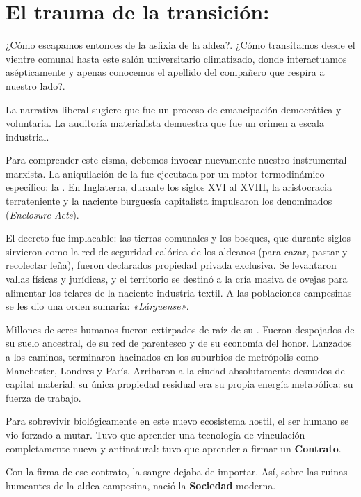 \section{El trauma de la transición: \Cercamientos}

¿Cómo escapamos entonces de la asfixia de la aldea?. ¿Cómo transitamos desde el vientre comunal hasta este salón universitario climatizado, donde interactuamos asépticamente y apenas conocemos el apellido del compañero que respira a nuestro lado?. 

La narrativa liberal sugiere que fue un proceso de emancipación democrática y voluntaria. La auditoría materialista demuestra que fue un crimen a escala industrial. 

Para comprender este cisma, debemos invocar nuevamente nuestro instrumental marxista. La aniquilación de la \Gemeinschaft{} fue ejecutada por un motor termodinámico específico: la \textbf{\AcumulacionOriginaria}. En Inglaterra, durante los siglos XVI al XVIII, la aristocracia terrateniente y la naciente burguesía capitalista impulsaron los denominados \textbf{\Cercamientos} (\textit{Enclosure Acts}). 

El decreto fue implacable: las tierras comunales y los bosques, que durante siglos sirvieron como la red de seguridad calórica de los aldeanos (para cazar, pastar y recolectar leña), fueron declarados propiedad privada exclusiva. Se levantaron vallas físicas y jurídicas, y el territorio se destinó a la cría masiva de ovejas para alimentar los telares de la naciente industria textil. A las poblaciones campesinas se les dio una orden sumaria: \textit{«Lárguense»}.

Millones de seres humanos fueron extirpados de raíz de su \Gemeinschaft{}. Fueron despojados de su suelo ancestral, de su red de parentesco y de su economía del honor. Lanzados a los caminos, terminaron hacinados en los suburbios de metrópolis como Manchester, Londres y París. Arribaron a la ciudad absolutamente desnudos de capital material; su única propiedad residual era su propia energía metabólica: su fuerza de trabajo.

Para sobrevivir biológicamente en este nuevo ecosistema hostil, el ser humano se vio forzado a mutar. Tuvo que aprender una tecnología de vinculación completamente nueva y antinatural: tuvo que aprender a firmar un \textbf{Contrato}. 

Con la firma de ese contrato, la sangre dejaba de importar. Así, sobre las ruinas humeantes de la aldea campesina, nació la \textbf{Sociedad} moderna.

